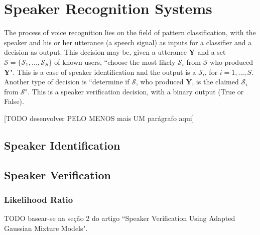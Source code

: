 \chapter{Speaker Recognition Systems}

The process of voice recognition lies on the field of pattern classification, with the speaker and his or her utterance (a speech signal) as inputs for a classifier and a decision as output. This decision may be, given a utterance $\boldsymbol{Y}$ and a set $\boldsymbol{\mathcal{S}} = \{\mathcal{S}_1, ..., \mathcal{S}_S\}$ of known users, ``choose the most likely $\mathcal{S}_i$ from $\boldsymbol{\mathcal{S}}$ who produced $\boldsymbol{Y}$". This is a case of speaker identification and the output is a $\mathcal{S}_i$, for $i = 1, ..., S$. Another type of decision is ``determine if $\mathcal{S}$, who produced $\boldsymbol{Y}$, is the claimed $\mathcal{S}_i$ from $\boldsymbol{\mathcal{S}}$". This is a speaker verification decision, with a binary output (True or False).

[TODO desenvolver PELO MENOS mais UM parágrafo aqui]

\section{Speaker Identification}

\section{Speaker Verification}

\subsection{Likelihood Ratio}

TODO basear-se na seção 2 do artigo ``Speaker Verification Using Adapted Gaussian Mixture Models".